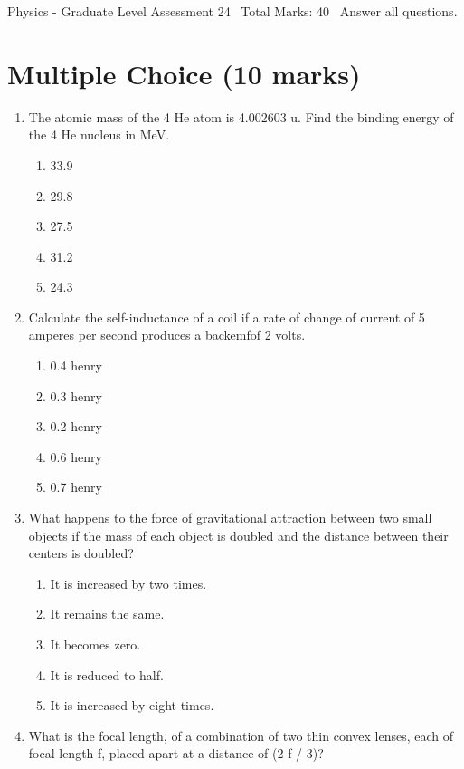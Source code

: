 \documentclass[12pt]{article}
\begin{document}
\begin{center}
Physics - Graduate Level Assessment 24 \
Total Marks: 40 \
Answer all questions.
\end{center}

\section*{Multiple Choice (10 marks)}
\begin{enumerate}[label=\arabic*.]
\item The atomic mass of the 4 He atom is 4.002603 u. Find the binding energy of the 4 He nucleus in MeV.
\begin{enumerate}[label=(\alph*)]
    \item 33.9
    \item 29.8
    \item 27.5
    \item 31.2
    \item 24.3
\end{enumerate}
\item Calculate the self-inductance of a coil if a rate of change of current of 5 amperes per second produces a backemfof 2 volts.
\begin{enumerate}[label=(\alph*)]
    \item 0.4 henry
    \item 0.3 henry
    \item 0.2 henry
    \item 0.6 henry
    \item 0.7 henry
\end{enumerate}
\item What happens to the force of gravitational attraction between two small objects if the mass of each object is doubled and the distance between their centers is doubled?
\begin{enumerate}[label=(\alph*)]
    \item It is increased by two times.
    \item It remains the same.
    \item It becomes zero.
    \item It is reduced to half.
    \item It is increased by eight times.
\end{enumerate}
\item What is the focal length, of a combination of two thin convex lenses, each of focal length f, placed apart at a distance of (2 f / 3)?
\begin{enumerate}[label=(\alph*)]

\end{enumerate}
\end{enumerate}
\end{document}
